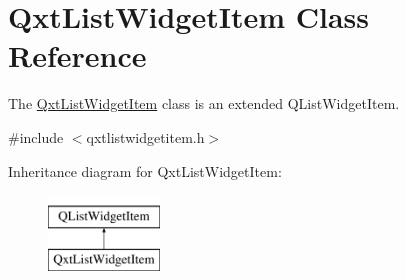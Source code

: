 \hypertarget{class_qxt_list_widget_item}{\section{Qxt\-List\-Widget\-Item Class Reference}
\label{class_qxt_list_widget_item}
}


The \hyperlink{class_qxt_list_widget_item}{Qxt\-List\-Widget\-Item} class is an extended Q\-List\-Widget\-Item.  




{\ttfamily \#include $<$qxtlistwidgetitem.\-h$>$}

Inheritance diagram for Qxt\-List\-Widget\-Item\-:\begin{figure}[H]
\begin{center}
\leavevmode
\includegraphics[height=2.000000cm]{class_qxt_list_widget_item}
\end{center}
\end{figure}
